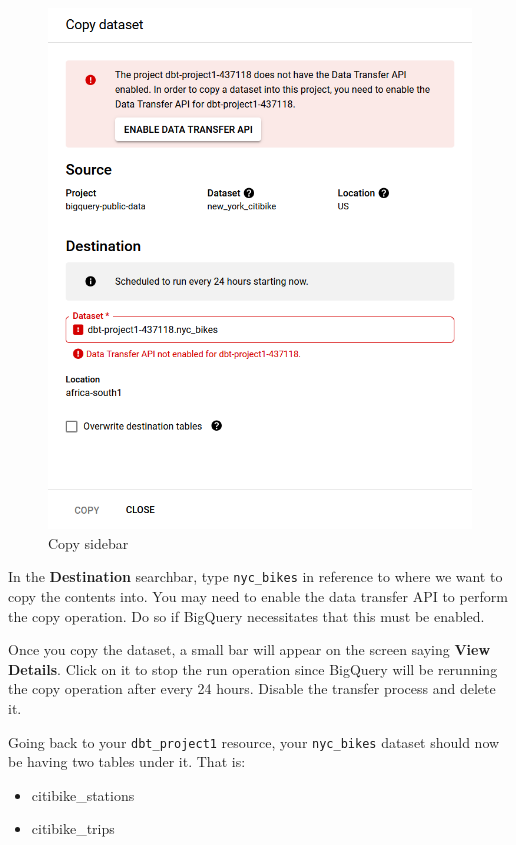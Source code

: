 \documentclass[
]{book}
\providecommand{\tightlist}{%
  \setlength{\itemsep}{0pt}\setlength{\parskip}{0pt}}
\begin{document}
\begin{figure}
\centering
\includegraphics{./images/copy_sidebar.png}
\caption{Copy sidebar}
\end{figure}

In the \textbf{Destination} searchbar, type \texttt{nyc\_bikes} in reference to where we want to copy the contents into. You may need to enable the data transfer API to perform the copy operation. Do so if BigQuery necessitates that this must be enabled.

Once you copy the dataset, a small bar will appear on the screen saying \textbf{View Details}. Click on it to stop the run operation since BigQuery will be rerunning the copy operation after every 24 hours. Disable the transfer process and delete it.

Going back to your \texttt{dbt\_project1} resource, your \texttt{nyc\_bikes} dataset should now be having two tables under it. That is:

\begin{itemize}
\tightlist
\item
  citibike\_stations
\item
  citibike\_trips
\end{itemize}
\end{document}
